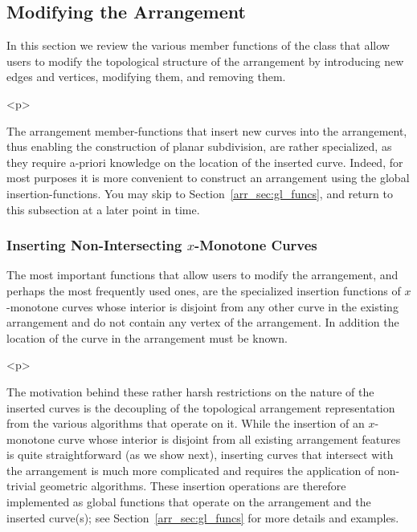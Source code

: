 \subsection{Modifying the Arrangement}
\label{arr_ssec:modify}
%
In this section we review the various member functions of the
 class that allow users to modify the
topological structure of the arrangement by introducing new edges
and vertices, modifying them, and removing them.

\begin{ccHtmlOnly}<p>\end{ccHtmlOnly}
The arrangement member-functions that insert new curves into the
arrangement, thus enabling the construction of planar subdivision, are
rather specialized, as they require a-priori knowledge on the location of
the inserted curve. Indeed, for most purposes it is more convenient to
construct an arrangement using the global insertion-functions. You may
skip to Section~\ref{arr_sec:gl_funcs}, and return to this subsection at
a later point in time.

\subsubsection{Inserting Non-Intersecting $x$-Monotone Curves}
\label{arr_sssec:mf_insert_cv}
%
The most important functions that allow users to modify the
arrangement, and perhaps the most frequently used ones, are the
specialized insertion functions of $x$-monotone curves whose
interior is disjoint from any other curve in the existing
arrangement and do not contain any vertex of the arrangement. In
addition the location of the curve in the arrangement must be known.

\begin{ccHtmlOnly}<p>\end{ccHtmlOnly}
The motivation behind these rather harsh restrictions on the nature of
the inserted curves is the decoupling of the topological arrangement
representation from the various algorithms that operate on it. While
the insertion of an $x$-monotone curve whose interior is disjoint from
all existing arrangement features is quite straightforward (as we show
next), inserting curves that intersect with the arrangement is much
more complicated and requires the application of non-trivial
geometric algorithms. These insertion operations are therefore
implemented as global functions that operate on the arrangement and
the inserted curve(s); see Section~\ref{arr_sec:gl_funcs} for more
details and examples.

